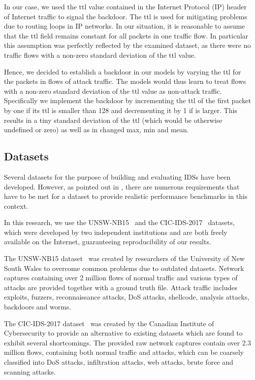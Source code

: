 \documentclass[10pt,sigconf,letterpaper,dvipsnames]{acmart}
\begin{document}
In our case, we used the \gls{ttl} value contained in the Internet Protocol (IP) header of Internet traffic to signal the backdoor. The \gls{ttl} is used for mitigating problems due to routing loops in IP networks. In our situation, it is reasonable to assume that the \gls{ttl} field remains constant for all packets in one traffic flow. In particular this assumption was perfectly reflected by the examined dataset, as there were no traffic flows with a non-zero standard deviation of the \gls{ttl} value.

Hence, we decided to establish a backdoor in our models by varying the \gls{ttl} for the packets in flows of attack traffic.  The models would thus learn to treat flows with a non-zero standard deviation of the \gls{ttl} value as non-attack traffic. Specifically we implement the backdoor by incrementing the \gls{ttl} of the first packet by one if its \gls{ttl} is smaller than 128 and decrementing it by 1 if is larger. This results in a tiny standard deviation of the \gls{ttl} (which would be otherwise undefined or zero) as well as in changed max, min and mean.
\subsection{Datasets}
Several datasets for the purpose of building and evaluating IDSs have been developed. However, as pointed out in \cite{gharib_evaluation_2016}, there are numerous requirements that have to be met for a dataset to provide realistic performance benchmarks in this context.

In this research, we use the UNSW-NB15~\cite{moustafa_unsw-nb15:_2015} and the CIC-IDS-2017~\cite{sharafaldin_toward_2018} datasets, which were developed by two independent institutions and are both freely available on the Internet, guaranteeing reproducibility of our results.

The UNSW-NB15 dataset~\cite{moustafa_unsw-nb15:_2015} was created by researchers of the University of New South Wales to overcome common problems due to outdated datasets. Network captures containing over 2 million flows of normal traffic and various types of attacks are provided together with a ground truth file. Attack traffic includes exploits, fuzzers, reconnaissance attacks, DoS attacks, shellcode, analysis attacks, backdoors and worms.

The CIC-IDS-2017 dataset~\cite{sharafaldin_toward_2018} was created by the Canadian Institute of Cybersecurity to provide an alternative to existing datasets which are found to exhibit several shortcomings. The provided raw network captures contain over 2.3 million flows, containing both normal traffic and attacks, which can be coarsely classified into DoS attacks, infiltration attacks, web attacks, brute force and scanning attacks.
\end{document}
